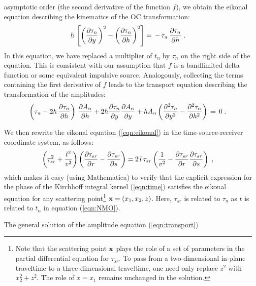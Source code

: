 asymptotic order (the second derivative of the function $f$), we
obtain the eikonal equation describing the kinematics of the OC
transformation:
\begin{equation}
h \, \left[     {\left( \partial \tau_n \over \partial y \right)}^2 - 
                {\left( \partial \tau_n \over \partial h \right)}^2
     \right] = \, - \, \tau_n \, {\partial \tau_n \over \partial h} \;.  
\label{eqn:eikonal} 
\end{equation}
In this equation, we have replaced a multiplier of $t_n$ by
$\tau_n$ on the right side of the equation.  This is consistent with
our assumption that $f$ is a bandlimited delta function or some
equivalent impulsive source.
Analogously, collecting the terms containing the first derivative of
$f$ leads to the transport equation describing the transformation
of the amplitudes:
\begin{equation}
\left( \tau_n - 2h \, {\partial \tau_n \over {\partial h}} \right)
\, {\partial A_n \over \partial h} + 2h {\partial \tau_n \over \partial
y}   {\partial A_n \over \partial y} + h A_n \left( {\partial^2 \tau_n
\over {\partial y^2}} - {\partial^2 \tau_n \over {\partial h^2}} 
\right) \, = \, 0 \;.
\label{eqn:transport} 
\end{equation}
\par
We then rewrite the eikonal equation (\ref{eqn:eikonal}) in the
time-source-receiver coordinate system, as follows:
\begin{equation}
\left( \tau_{sr}^2 + {{l^2} \over {v^2}} \right) \left( {\partial \tau_{sr}
\over \partial r} -   {\partial \tau_{sr} \over \partial s} \right) = 2 \,l\,
\tau_{sr} \left( {1 \over {v^2}} - {\partial \tau_{sr} \over \partial r}
{\partial \tau_{sr} \over \partial s} \right) \;,
\label{eqn:SCeikonal} 
\end{equation}
which makes it easy (using Mathematica) to verify that the explicit
expression for the phase of the Kirchhoff integral kernel (\ref{eqn:time})
satisfies the eikonal equation for any scattering point\footnote{Note
that the scattering point $\bf{x}$ plays the role of a set of
parameters in the partial differential equation for $\tau_{sr}$.  To
pass from a two-dimensional in-plane traveltime to a three-dimensional
traveltime, one need only replace $z^2$ with $x_2^2 + z^2$. The role
of $x = x_1$ remains unchanged in the solution.}  ${\bf x} = (x_1 ,
x_2 , z)$.  Here, $\tau_{sr}$ is related to $\tau_n$ as $t$ is related
to $t_n$ in equation (\ref{eqn:NMO}).
\par
The general solution of the amplitude equation (\ref{eqn:transport})
